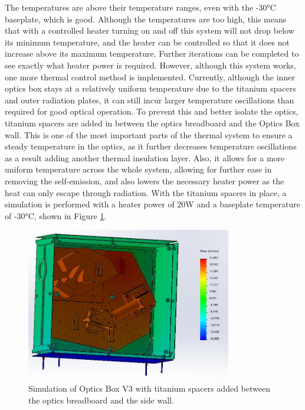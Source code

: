 The temperatures are above their temperature ranges, even with the -30°C baseplate, which is good. Although the temperatures are too high, this means that with a controlled heater turning on and off this system will not drop below its minimum temperature, and the heater can be controlled so that it does not increase above its maximum temperature. Further iterations can be completed to see exactly what heater power is required. However, although this system works, one more thermal control method is implemented. Currently, although the inner optics box stays at a relatively uniform temperature due to the titanium spacers and outer radiation plates, it can still incur larger temperature oscillations than required for good optical operation. To prevent this and better isolate the optics, titanium spacers are added in between the optics breadboard and the Optics Box wall. This is one of the most important parts of the thermal system to ensure a steady temperature in the optics, as it further decreases temperature oscillations as a result adding another thermal insulation layer. Also, it allows for a more uniform temperature across the whole system, allowing for further ease in removing the self-emission, and also lowers the necessary heater power as the heat can only escape through radiation. With the titanium spacers in place, a simulation is performed with a heater power of 20W and a baseplate temperature of -30°C, shown in Figure \ref{fig:OB_V3_TA_3_SPACERS_ADDED}.

\begin{figure}
    \centering
    \includegraphics[width=0.8\textwidth]{chap3_images/LIFE_V3_images/TA_-30_deg_20W_heater_isolated_board.JPG}
    \caption{Simulation of Optics Box V3 with titanium spacers added between the optics breadboard and the side wall.}
    \label{fig:OB_V3_TA_3_SPACERS_ADDED}
\end{figure}

